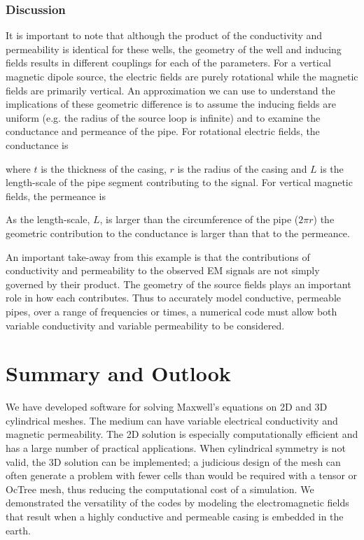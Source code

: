 \documentclass[preprint,review,3p,times,onecolumn,authoryear]{elsarticle}
\begin{document}






\subsubsection{Discussion}

It is important to note that although the product of the conductivity and permeability is identical for these wells, the geometry of the well and inducing fields results in different couplings for each of the parameters. For a vertical magnetic dipole source, the electric fields are purely rotational while the magnetic fields are primarily vertical. An approximation we can use to understand the implications of these geometric difference is to assume the inducing fields are uniform (e.g. the radius of the source loop is infinite) and to examine the conductance and permeance of the pipe. For rotational electric fields, the conductance is

where $t$ is the thickness of the casing, $r$ is the radius of the casing and $L$ is the length-scale of the pipe segment contributing to the signal. For vertical magnetic fields, the permeance is

As the length-scale, $L$, is larger than the circumference of the pipe ($2\pi r$) the geometric contribution to the conductance is larger than that to the permeance.

An important take-away from this example is that the contributions of conductivity and permeability to the observed EM signals are not simply governed by their product. The geometry of the source fields plays an important role in how each contributes. Thus to accurately model conductive, permeable pipes, over a range of frequencies or times, a numerical code must allow both variable conductivity and variable permeability to be considered.


\section{Summary and Outlook}

We have developed software for solving Maxwell's equations on 2D and 3D cylindrical meshes. The medium can have variable electrical conductivity and magnetic permeability. The 2D solution is especially computationally efficient and has a large number of practical applications. When cylindrical symmetry is not valid, the 3D solution can be implemented; a judicious design of the mesh can often generate a problem with fewer cells than would be required with a tensor or OcTree mesh, thus reducing the computational cost of a simulation. We demonstrated the versatility of the codes by modeling the electromagnetic fields that result when a highly conductive and permeable casing is embedded in the earth.
\end{document}
